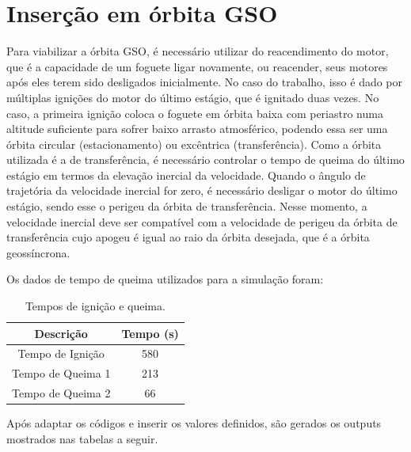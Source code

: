 \section{Inserção em órbita GSO}
Para viabilizar a órbita GSO, é necessário utilizar do reacendimento do motor, que é a capacidade de um foguete ligar novamente, ou reacender, seus motores após eles terem sido desligados inicialmente. No caso do trabalho, isso é dado por múltiplas ignições do motor do último estágio, que é ignitado duas vezes. No caso, a primeira ignição coloca o foguete em órbita baixa com periastro numa altitude suficiente para sofrer baixo arrasto atmosférico, podendo essa ser uma órbita circular (estacionamento) ou excêntrica (transferência). Como a órbita utilizada é a de transferência, é necessário controlar o tempo de queima do último estágio em termos da elevação inercial da velocidade. Quando o ângulo de trajetória da velocidade inercial for zero, é necessário desligar o motor do último estágio, sendo esse o perigeu da órbita de transferência. Nesse momento, a velocidade inercial deve ser compatível com a velocidade de perigeu da órbita de transferência cujo apogeu é igual ao raio da órbita desejada, que é a órbita geossíncrona. 

Os dados de tempo de queima utilizados para a simulação foram:

\begin{table}[h]
\centering
\caption{Tempos de ignição e queima.}
\begin{tabular}{|c|c|}
\hline
\textbf{Descrição} & \textbf{Tempo (s)} \\
\hline
Tempo de Ignição & 580 \\
\hline
Tempo de Queima 1 & 213 \\
\hline
Tempo de Queima 2 & 66 \\
\hline
\end{tabular}

\end{table}


Após adaptar os códigos e inserir os valores definidos, são gerados os outputs mostrados nas tabelas a seguir.

